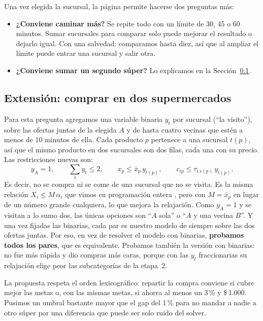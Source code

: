\documentclass[10pt,a4paper]{article}
\newcommand{\pesos}[1]{\$\,#1}
\begin{document}
Una vez elegida la sucursal, la página permite hacerse dos preguntas más:

\begin{itemize}
  \item \textbf{¿Conviene caminar más?} Se repite todo con un límite de 30, 45 o 60
        minutos. Sumar sucursales para comparar solo puede mejorar el resultado o
        dejarlo igual. Con una salvedad: comparamos hasta diez, así que al ampliar
        el límite puede entrar una sucursal y salir otra.
  \item \textbf{¿Conviene sumar un segundo súper?} Lo explicamos en la
        Sección~\ref{sec:dos}.
\end{itemize}

\subsection{Extensión: comprar en dos supermercados}
\label{sec:dos}

Para esta pregunta agregamos una variable binaria $y_t$ por sucursal (``la visito''),
sobre las ofertas juntas de la elegida $A$ y de hasta cuatro vecinas que estén a
menos de 10 minutos de ella. Cada producto $p$ pertenece a una sucursal $t(p)$, así
que el mismo producto en dos sucursales son dos filas, cada una con su precio. Las
restricciones nuevas son:
\[
y_A = 1, \qquad \sum_t y_t \leq 2, \qquad
x_p \leq \bar{x}_p\, y_{t(p)}, \qquad
c_{ip} \leq \tau_{i\,s(p)}\, y_{t(p)}.
\]
Es decir, no se compra ni se come de una sucursal que no se visita. Es la misma
relación $X_i \leq M\,\alpha_i$ que vimos en programación entera \cite{clase-mip},
pero con $M = \bar{x}_p$ en lugar de un número grande cualquiera, lo que mejora la
relajación. Como $y_A = 1$ y se visitan a lo sumo dos, las únicas opciones son ``$A$
sola'' o ``$A$ y una vecina $B$''. Y una vez fijadas las binarias, cada par es
nuestro modelo de siempre sobre las dos ofertas juntas. Por eso, en vez de resolver
el modelo con binarias, \textbf{probamos todos los pares}, que es equivalente.
Probamos también la versión con binarias: no fue más rápida y dio compras más caras,
porque con las $y_t$ fraccionarias su relajación elige peor las subcategorías de la
etapa~2.

La propuesta respeta el orden lexicográfico: repartir la compra conviene si cubre
mejor las metas o, con las mismas metas, si ahorra al menos un 3\,\% y \pesos{1.000}.
Pusimos un umbral bastante mayor que el gap del 1\,\% para no mandar a nadie a otro
súper por una diferencia que puede ser solo ruido del solver.
\end{document}
